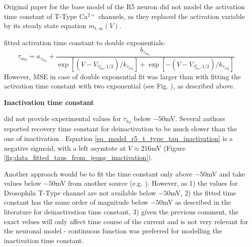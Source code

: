 \documentclass[../../workflow.tex]{subfiles}
\begin{document}
\begin{note}
    Original paper for the base model of the R5 neuron \cite{wangMultipleDynamicalModes1994} did not
    model the activation time constant of T-Type Ca$^{2+}$ channels, as they replaced the
    activation variable by its steady state equation $m_{t,\infty}(V)$.
\end{note}

\begin{note}
    \cite{destexheVivoVitroComputational1996} fitted activation time constant to double exponentials:
    \begin{equation}\label{eq:fitting_t_type_activation_delay_with_double_exponential}
        \tau_{m_T} = a_{\tau_{m_T}} + \frac{b_{\tau_{m_T}}}{ \exp{[(V - V_{\tau_{m_T}^1,1/2})/k_{\tau_{m_T^1}}]} + \exp{[-(V - V_{\tau_{m_T}^2,1/2})/k_{\tau_{m_T^2}}]}}
    \end{equation}
    However, MSE in case of double exponential fit was larger than with fitting the activation time constant with
    two exponential (see Fig. ), as described above.
\end{note}


\textbf{Inactivation time constant}

\cite{jeongCaa1TFlyTtype2015} did not provide experimental values for $\tau_{h_T}$ below $-50$mV.
Several authors reported recovery time constant for deinactivation to be much slower than the one of inactivation
\cite{huguenardNovelTtypeCurrent1992, destexheVivoVitroComputational1996, huguenardSimulationCurrentsInvolved1992}.
Equation \ref{eq_model_r5_t_type_tau_inactivation} is a negative sigmoid, with a left
asymtote at $V\approx216$mV (Figure \ref{fig:data_fitted_taus_from_jeong_inactivation}).

\begin{note}
    Another approach would be to fit the time constant only above $-50$mV and take
    values below $-50$mV from another source (e.g. \cite{huguenardSimulationCurrentsInvolved1992}).
    However, as 1) the values for Drosophila T-Type channel are not available below $-50$mV,
    2) the fitted time constant has the same order of magnitude below $-50$mV as described
    in the literature for deinactivation time constant, 3) given the previous comment, the
    exact velues will only affect time course of the current and is not very relevant for the
    neuronal model - continuous function was preferred for modelling the inactivation time constant.
\end{note}
\end{document}
